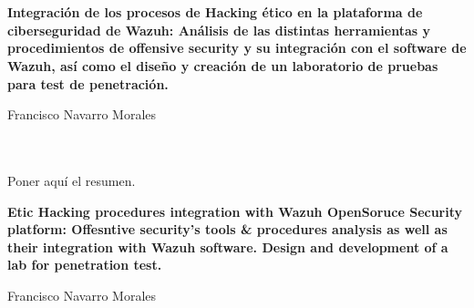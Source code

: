 \chapter*{}






\cleardoublepage
\thispagestyle{empty}

\begin{center}
{\large\bfseries Integración de los procesos de Hacking ético en la plataforma de ciberseguridad de Wazuh: Análisis de las distintas herramientas y procedimientos de offensive security y su integración con el software de Wazuh, así como el diseño y creación de un laboratorio de pruebas para test de penetración.}\\
\end{center}
\begin{center}
Francisco Navarro Morales\\
\end{center}

\\

\vspace{0.7cm}
\\

Poner aquí el resumen.
\cleardoublepage


\thispagestyle{empty}


\begin{center}
{\large\bfseries Etic Hacking procedures integration with Wazuh OpenSoruce Security platform: Offesntive security's tools \& procedures analysis as well as their integration with Wazuh software. Design and development of a lab for penetration test.}\\
\end{center}
\begin{center}
Francisco Navarro Morales\\
\end{center}

\\

\vspace{0.7cm}
\\

